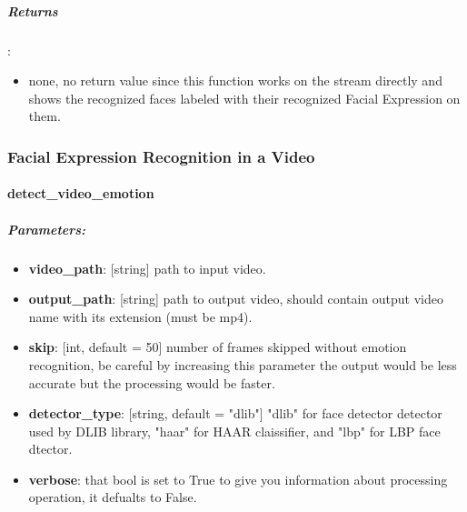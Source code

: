 \subparagraph{Returns}:
\begin{changemargin}{0.5cm}{0cm}
\begin{itemize}[noitemsep,nolistsep]
	\item none, no return value since this function works on the stream directly and shows the recognized faces labeled with their recognized Facial Expression on them.
\end{itemize}
\end{changemargin}
	
\begin{comment}
\subparagraph{Usage}:
\begin{changemargin}{0.5cm}{0cm}
\begin{itemize}
	\item import the module:
	\begin{lstlisting}[language=Python]
	from Cerebro.interface Import video_stream as vs\end{lstlisting}
	\item call it:
	\begin{lstlisting}[language=Python]
	vs.detect_stream_emotions(skip)\end{lstlisting}
\end{itemize}
\end{changemargin}
\end{comment}



\subsubsection{Facial Expression Recognition in a Video}
\paragraph{detect\_video\_emotion}
\subparagraph{Parameters:}
\begin{changemargin}{0.5cm}{0cm} 
	\begin{itemize}
		\item  \textbf{video\_path}: [string] path to input video.
		\item  \textbf{output\_path}: [string] path to output video, should contain output video name with its extension (must be mp4).
		\item  \textbf{skip}: [int, default = 50] number of frames skipped without emotion recognition, be careful by increasing this parameter the output would be less accurate but the processing would be faster.
		\item \textbf{detector\_type}: [string, default = "dlib"] "dlib" for face detector detector used by DLIB library, "haar" for HAAR claissifier, and "lbp" for LBP face dtector.
		\item  \textbf{verbose}: that bool is set to True to give you information about processing operation, it defualts to False.
	\end{itemize}
\end{changemargin}

